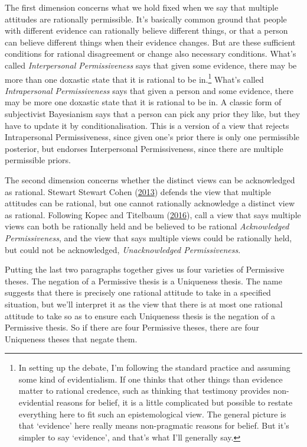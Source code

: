 \documentclass[
  12pt,
  letterpaper,
  DIV=11,
  numbers=noendperiod]{scrreprt}
\begin{document}
The first dimension concerns what we hold fixed when we say that
multiple attitudes are rationally permissible. It's basically common
ground that people with different evidence can rationally believe
different things, or that a person can believe different things when
their evidence changes. But are these sufficient conditions for rational
disagreement or change also necessary conditions. What's called
\emph{Interpersonal Permissiveness} says that given some evidence, there
may be more than one doxastic state that it is rational to be
in.\footnote{In setting up the debate, I'm following the standard
  practice and assuming some kind of evidentialism. If one thinks that
  other things than evidence matter to rational credence, such as
  thinking that testimony provides non-evidential reasons for belief, it
  is a little complicated but possible to restate everything here to fit
  such an epistemological view. The general picture is that `evidence'
  here really means non-pragmatic reasons for belief. But it's simpler
  to say `evidence', and that's what I'll generally say.} What's called
\emph{Intrapersonal Permissiveness} says that given a person and some
evidence, there may be more one doxastic state that it is rational to be
in. A classic form of subjectivist Bayesianism says that a person can
pick any prior they like, but they have to update it by
conditionalisation. This is a version of a view that rejects
Intrapersonal Permissiveness, since given one's prior there is only one
permissible posterior, but endorses Interpersonal Permissiveness, since
there are multiple permissible priors.

The second dimension concerns whether the distinct views can be
acknowledged as rational. Stewart Stewart Cohen
(\protect\hyperlink{ref-Cohen2013}{2013}) defends the view that multiple
attitudes can be rational, but one cannot rationally acknowledge a
distinct view as rational. Following Kopec and Titelbaum
(\protect\hyperlink{ref-KopecTitelbaum2016}{2016}), call a view that
says multiple views can both be rationally held and be believed to be
rational \emph{Acknowledged Permissiveness}, and the view that says
multiple views could be rationally held, but could not be acknowledged,
\emph{Unacknowledged Permissiveness}.

Putting the last two paragraphs together gives us four varieties of
Permissive theses. The negation of a Permissive thesis is a Uniqueness
thesis. The name suggests that there is precisely one rational attitude
to take in a specified situation, but we'll interpret it as the view
that there is at most one rational attitude to take so as to ensure each
Uniqueness thesis is the negation of a Permissive thesis. So if there
are four Permissive theses, there are four Uniqueness theses that negate
them.
\end{document}
